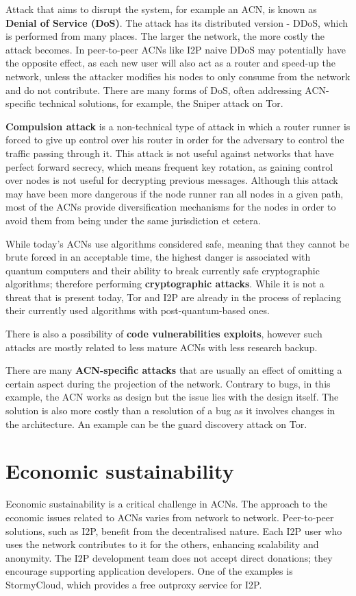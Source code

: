 Attack that aims to disrupt the system, for example an ACN, is known as \textbf{Denial of Service (DoS)}. The attack has its distributed version - DDoS, which is performed from many places. The larger the network, the more costly the attack becomes. In peer-to-peer ACNs like I2P naive DDoS may potentially have the opposite effect, as each new user will also act as a router and speed-up the network, unless the attacker modifies his nodes to only consume from the network and do not contribute. There are many forms of DoS, often addressing ACN-specific technical solutions, for example, the Sniper attack \cite{sniper} on Tor.

\textbf{Compulsion attack} is a non-technical type of attack in which a router runner is forced to give up control over his router in order for the adversary to control the traffic passing through it. This attack is not useful against networks that have perfect forward secrecy, which means frequent key rotation, as gaining control over nodes is not useful for decrypting previous messages. Although this attack may have been more dangerous if the node runner ran all nodes in a given path, most of the ACNs provide diversification mechanisms for the nodes in order to avoid them from being under the same jurisdiction et cetera.

While today's ACNs use algorithms considered safe, meaning that they cannot be brute forced in an acceptable time, the highest danger is associated with quantum computers and their ability to break currently safe cryptographic algorithms; therefore performing \textbf{cryptographic attacks}. While it is not a threat that is present today, Tor and I2P are already in the process of replacing their currently used algorithms with post-quantum-based ones.

There is also a possibility of \textbf{code vulnerabilities exploits}, however such attacks are mostly related to less mature ACNs with less research backup.

There are many \textbf{ACN-specific attacks} that are usually an effect of omitting a certain aspect during the projection of the network. Contrary to bugs, in this example, the ACN works as design but the issue lies with the design itself. The solution is also more costly than a resolution of a bug as it involves changes in the architecture. An example can be the guard discovery attack \cite{guard-discovery} on Tor.

\section{Economic sustainability}
Economic sustainability is a critical challenge in ACNs. The approach to the economic issues related to ACNs varies from network to network. Peer-to-peer solutions, such as I2P, benefit from the decentralised nature. Each I2P user who uses the network contributes to it for the others, enhancing scalability and anonymity. The I2P development team does not accept direct donations; they encourage supporting application developers. One of the examples is StormyCloud, which provides a free outproxy service for I2P.


